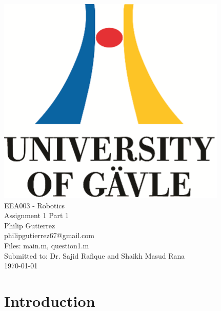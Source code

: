 \documentclass[a4paper, titlepage]{article}
\begin{document}

\begin{titlepage}
  \begin{center}
    \vspace*{1cm}
    \includegraphics[scale=1.0]{../figures/hig_logo_eng.png}\\
    \vspace{1.5cm}
    \large EEA003 - Robotics\\
    \large Assignment 1 Part 1\\
    \vspace{1.5cm}
    Philip Gutierrez\\
    philipgutierrez67@gmail.com\\
    Files: main.m, question1.m\\

    \vspace{1cm}
    Submitted to: Dr. Sajid Rafique and Shaikh Masud Rana\\    
    \vspace{1cm}
    \today
  \end{center}
\end{titlepage}

\tableofcontents
\clearpage



\section{Introduction}
\end{document}
